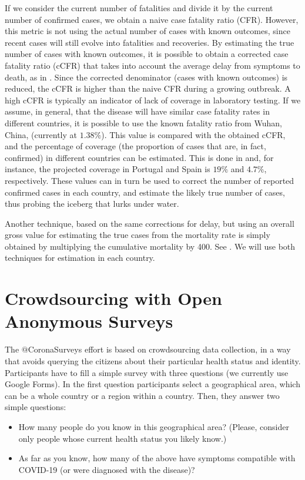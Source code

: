 \documentclass{article}
\begin{document}
If we consider the current number of fatalities and divide it by the current number of confirmed cases, we obtain a naive case fatality ratio (CFR). However, this metric is not using the actual number of cases with known outcomes, since recent cases will still evolve into fatalities and recoveries. By estimating the true number of cases with known outcomes, it is possible to obtain a corrected case fatality ratio (cCFR) that takes into account the average delay from symptoms to death, as in \cite{nishiura2009early}.
Since the corrected denominator (cases with known outcomes) is reduced, the cCFR is higher than the naive CFR during a growing outbreak. A high cCFR is typically an indicator of lack of coverage in laboratory testing. If we assume, in general, that the disease will have similar case fatality rates in different countries, it is possible to use the known fatality ratio from Wuhan, China, (currently at $1.38\%$). This value is compared with the obtained cCFR, and the percentage of coverage (the proportion of cases that are, in fact, confirmed) in different countries can be estimated. This is done in \cite{russel2020using} and, for instance, the projected coverage in Portugal and Spain is $19\%$ and $4.7\%$, respectively. These values can in turn be used to correct the number of reported confirmed cases in each country, and estimate the likely true number of cases, thus probing the iceberg that lurks under water.

Another technique, based on the same corrections for delay, but using an overall gross value for estimating the true cases from the mortality rate is simply obtained by multiplying the cumulative mortality by 400. See \cite{maxmen2020much}. We will use both techniques for estimation in each country.

\section{Crowdsourcing with Open Anonymous Surveys}

The $@$CoronaSurveys effort is based on crowdsourcing data collection, in a way that avoids querying the citizens about their particular health status and identity. Participants have to fill a simple survey with three questions (we currently use Google Forms). In the first question participants select a geographical area, which can be a whole country or a region within a country. Then, they answer two simple questions: 

\begin{itemize}
\item How many people do you know in this geographical area? (Please, consider only people whose current health status you likely know.)
\item As far as you know, how many of the above have symptoms compatible with COVID-19 (or were diagnosed with the disease)?
\end{itemize}
\end{document}
